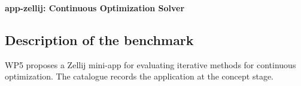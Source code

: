 \textbf{app-zellij: Continuous Optimization Solver}
\label{sec:app:specs:app-zellij}



\subsection{Description of the benchmark}
WP5 proposes a Zellij mini-app for evaluating iterative methods for
continuous optimization. The catalogue records the application at the
concept stage.
